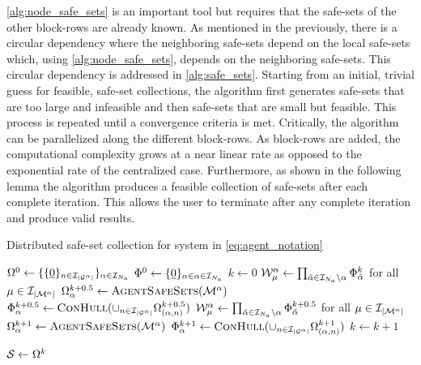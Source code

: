 \autoref{alg:node_safe_sets} is an important tool but requires that the safe-sets of the other block-rows are already known. As mentioned in the previously, there is a circular dependency where the neighboring safe-sets depend on the local safe-sets which, using \autoref{alg:node_safe_sets}, depends on the neighboring safe-sets. This circular dependency is addressed in \autoref{alg:safe_sets}. Starting from an initial, trivial guess for feasible, safe-set collections, the algorithm first generates safe-sets that are too large and infeasible and then safe-sets that are small but feasible. This process is repeated until a convergence criteria is met. Critically, the algorithm can be parallelized along the different block-rows. As block-rows are added, the computational complexity grows at a near linear rate as opposed to the exponential rate of the centralized case. Furthermore, as shown in the following lemma the algorithm produces a feasible collection of safe-sets after each complete iteration. This allows the user to terminate after any complete iteration and produce valid results. 
\begin{algorithm}[t]
\caption{Distributed safe-set collection for system in \autoref{eq:agent_notation}}\label{alg:safe_sets}
\begin{algorithmic}[1]
\State $\Omega^0\gets\{\{\underline{0}\}_{n\in\idxset{\gnumnodes[\agentidx]}}\}_{\agentidx\in\idxset{\numagents}}$
\State $\Phi^0\gets\{\underline{0}\}_{\alpha\in\alpha\in\mathcal{I}_{{N_a}}}$
\State $k\gets0$
\Repeat
	\ParFor{$\agentidx\in\idxset{\numagents}$}
		\State $\wcon[\modeidx]^\agentidx\gets\prod_{\tilde{\agentidx}\in\idxset{\numagents}\setminus \agentidx}\Phi^{k}_{\tilde\agentidx}$ for all $\modeidx\in\idxset{\nummodes[\agentidx]}$
		\State $\Omega^{k+0.5}_{\agentidx}\gets\Call{AgentSafeSets}{\modes[\agentidx]}$
		\State $\Phi^{k+0.5}_{\agentidx}\gets\Call{ConHull}{\cup_{n\in\idxset{\gnumnodes[{\agentidx}]}}\Omega^{k+0.5}_{({\agentidx},n)}}$
	\EndParFor
	\ParFor{$\agentidx\in\idxset{\numagents}$}
		\State $\wcon[\modeidx]^\agentidx\gets\prod_{\tilde{\agentidx}\in\idxset{\numagents}\setminus \agentidx}\Phi^{k+0.5}_{\tilde\agentidx}$ for all $\modeidx\in\idxset{\nummodes[\agentidx]}$
		\State $\Omega^{k+1}_{\agentidx}\gets\Call{AgentSafeSets}{\modes[\agentidx]}$
		\State $\Phi^{k+1}_{\agentidx}\gets\Call{ConHull}{\cup_{n\in\idxset{\gnumnodes[{\agentidx}]}}\Omega^{k+1}_{({\agentidx},n)}}$
	\EndParFor
	\State $k\gets k+1$

\State $\mathcal{S}\gets\Omega^k$
\EndProcedure
\end{algorithmic}
\end{algorithm}

